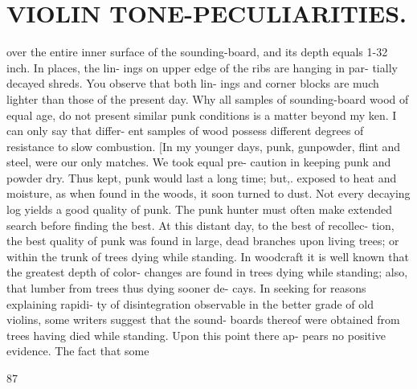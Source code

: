 \documentclass{article}
\begin{document}
\section*{VIOLIN TONE-PECULIARITIES.}
over the entire inner surface of the sounding-board, and its depth equals 1-32 inch. In places, the lin- ings on upper edge of the ribs are hanging in par- tially decayed shreds. You observe that both lin- ings and corner blocks are much lighter than those of the present day. Why all samples of sounding-board wood of equal age, do not present similar punk conditions is a matter beyond my ken. I can only say that differ- ent samples of wood possess different degrees of resistance to slow combustion. [In my younger days, punk, gunpowder, flint and steel, were our only matches. We took equal pre- caution in keeping punk and powder dry. Thus kept, punk would last a long time; but,. exposed to heat and moisture, as when found in the woods, it soon turned to dust. Not every decaying log yields a good quality of punk. The punk hunter must often make extended search before finding the best. At this distant day, to the best of recollec- tion, the best quality of punk was found in large, dead branches upon living trees; or within the trunk of trees dying while standing. In woodcraft it is well known that the greatest depth of color- changes are found in trees dying while standing; also, that lumber from trees thus dying sooner de- cays. In seeking for reasons explaining rapidi- ty of disintegration observable in the better grade of old violins, some writers suggest that the sound- boards thereof were obtained from trees having died while standing. Upon this point there ap- pears no positive evidence. The fact that some

87
\end{document}
